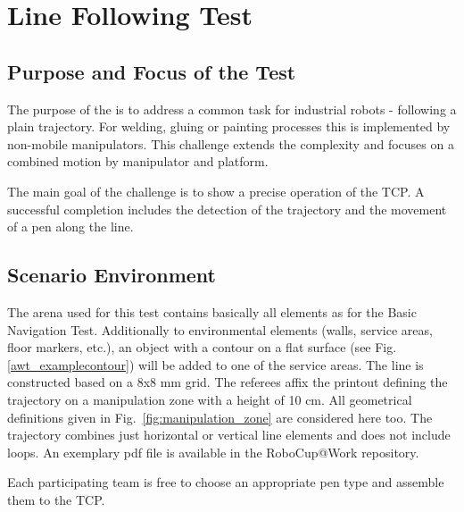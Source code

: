 
\newpage
\section{Line Following Test}

\subsection{Purpose and Focus of the Test}
The purpose of the  is to address a common task
for industrial robots - following a plain trajectory. For welding, gluing or
painting processes this is implemented by non-mobile manipulators.  This
challenge extends the complexity and focuses on a combined motion by manipulator
and platform. \par The main goal of the challenge is to show a precise operation of the TCP. A
successful completion includes the detection of the trajectory and the movement
of a pen along the line.

\subsection{Scenario Environment}
The arena used for this test contains basically all elements as for the Basic
Navigation Test. Additionally to environmental elements (walls, service areas,
floor markers, etc.), an object with a contour on a flat surface (see Fig.
\ref{awt_examplecontour}) will be added to one of the service areas. The line is
constructed based on a 8x8 mm grid. The referees affix the printout defining the
trajectory on a manipulation zone with a height of 10 cm. All geometrical
definitions given in Fig.~\ref{fig:manipulation_zone} are considered here too.
The trajectory combines just horizontal or vertical line elements and does not
include loops. An exemplary pdf file is available in the RoboCup@Work repository.

Each participating team is free to choose an appropriate pen type and assemble
them to the TCP.

